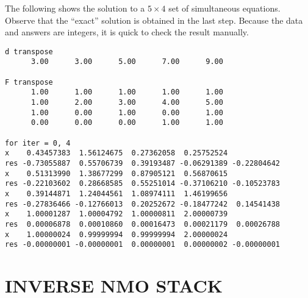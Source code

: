 \par
The following shows the solution to a $5 \times 4$ set of simultaneous equations.
Observe that the ``exact'' solution is obtained in the last step.
Because the data and answers are integers,
it is quick to check the result manually.
\par
\noindent
\footnotesize
\begin{verbatim}
d transpose
      3.00      3.00      5.00      7.00      9.00

F transpose
      1.00      1.00      1.00      1.00      1.00
      1.00      2.00      3.00      4.00      5.00
      1.00      0.00      1.00      0.00      1.00
      0.00      0.00      0.00      1.00      1.00

for iter = 0, 4
x    0.43457383  1.56124675  0.27362058  0.25752524
res -0.73055887  0.55706739  0.39193487 -0.06291389 -0.22804642
x    0.51313990  1.38677299  0.87905121  0.56870615
res -0.22103602  0.28668585  0.55251014 -0.37106210 -0.10523783
x    0.39144871  1.24044561  1.08974111  1.46199656
res -0.27836466 -0.12766013  0.20252672 -0.18477242  0.14541438
x    1.00001287  1.00004792  1.00000811  2.00000739
res  0.00006878  0.00010860  0.00016473  0.00021179  0.00026788
x    1.00000024  0.99999994  0.99999994  2.00000024
res -0.00000001 -0.00000001  0.00000001  0.00000002 -0.00000001
\end{verbatim}
\normalsize


\section{INVERSE NMO STACK}

